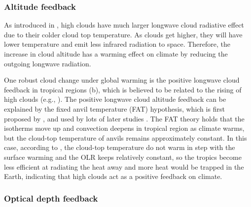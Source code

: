 
\subsubsection{Altitude feedback}

As introduced in , high clouds have much larger longwave cloud radiative effect due to their colder cloud top temperature. As clouds get higher, they will have lower temperature and emit less infrared radiation to space. Therefore, the increase in cloud altitude has a warming effect on climate by reducing the outgoing longwave radiation. 

One robust cloud change under global warming is the positive longwave cloud feedback in tropical regions (b), which is believed to be related to the rising of high clouds (e.g., \citealt{Wetherald1988cloud}).  
The positive longwave cloud altitude feedback can be explained by the fixed anvil temperature (FAT) hypothesis, which is first proposed by \cite{Hartmann2002FAT}, and used by lots of later studies \cite[e.g.,][]{Kuang2007,Zelinka2010longwave,Yoshimori2020fixed}. The FAT theory holds that the isotherms move up and convection deepens in tropical region as climate warms, but the cloud-top temperature of anvils remains approximately constant. In this case, according to , the cloud-top temperature do not warm in step with the surface warming and the OLR keeps relatively constant, so the tropics become less efficient at radiating the heat away and more heat would be trapped in the Earth, indicating that high clouds act as a positive feedback on climate.

\subsubsection{Optical depth feedback}


